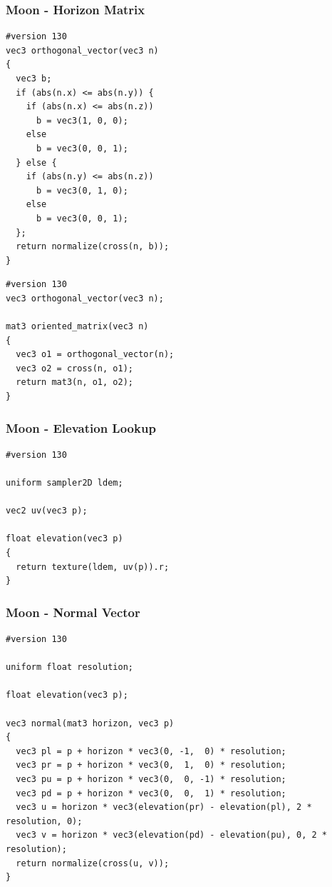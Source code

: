 \documentclass[aspectratio=169,11pt,xcolor=dvipsnames]{beamer}
\begin{document}
\begin{frame}[fragile]
  \frametitle{Moon {-} Horizon Matrix}
  \begin{minipage}[t]{.48\textwidth}
    \begin{verbatim}
#version 130
vec3 orthogonal_vector(vec3 n)
{
  vec3 b;
  if (abs(n.x) <= abs(n.y)) {
    if (abs(n.x) <= abs(n.z))
      b = vec3(1, 0, 0);
    else
      b = vec3(0, 0, 1);
  } else {
    if (abs(n.y) <= abs(n.z))
      b = vec3(0, 1, 0);
    else
      b = vec3(0, 0, 1);
  };
  return normalize(cross(n, b));
}
    \end{verbatim}
  \end{minipage}
  \begin{minipage}[t]{.48\textwidth}
    \begin{verbatim}
#version 130
vec3 orthogonal_vector(vec3 n);

mat3 oriented_matrix(vec3 n)
{
  vec3 o1 = orthogonal_vector(n);
  vec3 o2 = cross(n, o1);
  return mat3(n, o1, o2);
}
    \end{verbatim}
  \end{minipage}
\end{frame}

\begin{frame}[fragile]
  \frametitle{Moon {-} Elevation Lookup}
  \begin{verbatim}
#version 130

uniform sampler2D ldem;

vec2 uv(vec3 p);

float elevation(vec3 p)
{
  return texture(ldem, uv(p)).r;
}
  \end{verbatim}
\end{frame}

\begin{frame}[fragile]
  \frametitle{Moon {-} Normal Vector}
  \begin{verbatim}
#version 130

uniform float resolution;

float elevation(vec3 p);

vec3 normal(mat3 horizon, vec3 p)
{
  vec3 pl = p + horizon * vec3(0, -1,  0) * resolution;
  vec3 pr = p + horizon * vec3(0,  1,  0) * resolution;
  vec3 pu = p + horizon * vec3(0,  0, -1) * resolution;
  vec3 pd = p + horizon * vec3(0,  0,  1) * resolution;
  vec3 u = horizon * vec3(elevation(pr) - elevation(pl), 2 * resolution, 0);
  vec3 v = horizon * vec3(elevation(pd) - elevation(pu), 0, 2 * resolution);
  return normalize(cross(u, v));
}
  \end{verbatim}
\end{frame}
\end{document}
